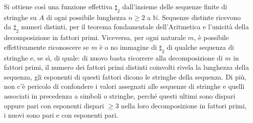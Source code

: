 \begin{enumerate}
          Si ottiene così una funzione effettiva $\sharp_2$ dall'insieme delle
          sequenze finite di stringhe su $A$ di ogni possibile lunghezza $n \geq 2$
          a $\mathbb{N}$. Sequenze distinte ricevono da $\sharp_2$ numeri distinti,
          per il teorema fondamentale dell'Aritmetica e l'unicità della
          decomposizione in fattori primi. Viceversa, per ogni naturale $m$, è
          possibile effettivamente riconoscere se $m$ è o no immagine di $\sharp_2$
          di qualche sequenza di stringhe e, se sì, di quale: di nuovo basta
          ricorrere alla decomposizione di $m$ in fattori primi, il numero dei
          fattori primi distinti coinvolti rivela la lunghezza della sequenza, gli
          esponenti di questi fattori dicono le stringhe della sequenza. Di più,
          non c'è pericolo di confondere i valori assegnati alle sequenze di stringhe
          e quelli associati in precedenza a simboli o stringhe, perché questi ultimi
          sono dispari oppure pari con esponenti dispari $\geq 3$ nella loro
          decomposizione in fattori primi, i nuovi sono pari e con esponenti pari.
\end{enumerate}